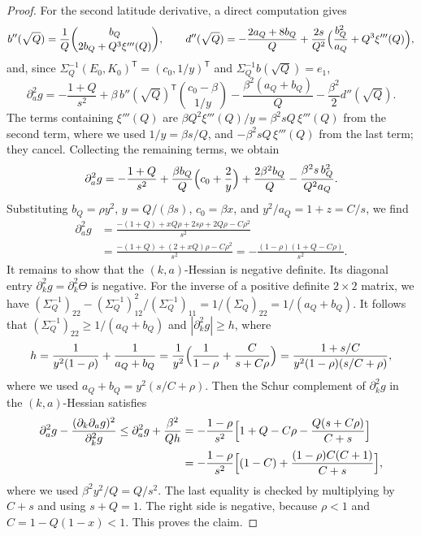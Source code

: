 \begin{proof}
For the second latitude derivative, a direct computation gives
\[
b''(\sqrt Q)=\frac1Q\binom{b_Q}{2b_Q+Q^3\xi'''(Q)},\qquad d''(\sqrt Q)=-\frac{2a_Q+8b_Q}Q+\frac{2s}{Q^2}\Bigl(\frac{b_Q^2}{a_Q}+Q^3\xi'''(Q)\Bigr),
\]
and, since $\Sigma_Q^{-1}(E_0,K_0)^{\mathsf T}=(c_0,1/y)^{\mathsf T}$ and $\Sigma_Q^{-1}b(\sqrt Q)=e_1$,
\[
\partial_a^2g=-\frac{1+Q}{s^2}+\beta\,b''(\sqrt Q)^{\mathsf T}\binom{c_0-\beta}{1/y}-\frac{\beta^2(a_Q+b_Q)}Q-\frac{\beta^2}2d''(\sqrt Q).
\]
The terms containing $\xi'''(Q)$ are $\beta Q^2\xi'''(Q)/y=\beta^2sQ\,\xi'''(Q)$ from the second term, where we used $1/y=\beta s/Q$, and $-\beta^2sQ\,\xi'''(Q)$ from the last term; they cancel. Collecting the remaining terms, we obtain
\[
\partial_a^2g=-\frac{1+Q}{s^2}+\frac{\beta b_Q}Q\Bigl(c_0+\frac2y\Bigr)+\frac{2\beta^2b_Q}Q-\frac{\beta^2s\,b_Q^2}{Q^2a_Q}.
\]
Substituting $b_Q=\rho y^2$, $y=Q/(\beta s)$, $c_0=\beta x$, and $y^2/a_Q=1+z=C/s$, we find
\[
\begin{aligned}
\partial_a^2g&=\frac{-(1+Q)+xQ\rho+2s\rho+2Q\rho-C\rho^2}{s^2}\\
&=\frac{-(1+Q)+(2+xQ)\rho-C\rho^2}{s^2}=-\frac{(1-\rho)(1+Q-C\rho)}{s^2} .
\end{aligned}
\]
It remains to show that the $(k,a)$-Hessian is negative definite. Its diagonal entry $\partial_k^2g=\partial_k^2\Theta$ is negative. For the inverse of a positive definite $2\times2$ matrix, we have $(\Sigma_Q^{-1})_{22}-(\Sigma_Q^{-1})_{12}^2/(\Sigma_Q^{-1})_{11}=1/(\Sigma_Q)_{22}=1/(a_Q+b_Q)$. It follows that $(\Sigma_Q^{-1})_{22}\ge1/(a_Q+b_Q)$ and $|\partial_k^2g|\ge h$, where
\[
h=\frac1{y^2(1-\rho)}+\frac1{a_Q+b_Q}=\frac1{y^2}\Bigl(\frac1{1-\rho}+\frac C{s+C\rho}\Bigr)=\frac{1+s/C}{y^2(1-\rho)(s/C+\rho)},
\]
where we used $a_Q+b_Q=y^2(s/C+\rho)$. Then the Schur complement of $\partial_k^2g$ in the $(k,a)$-Hessian satisfies
\[
\begin{aligned}
\partial_a^2g-\frac{(\partial_k\partial_ag)^2}{\partial_k^2g}\le\partial_a^2g+\frac{\beta^2}{Qh}&=-\frac{1-\rho}{s^2}\Bigl[1+Q-C\rho-\frac{Q(s+C\rho)}{C+s}\Bigr]\\
&=-\frac{1-\rho}{s^2}\Bigl[(1-C)+\frac{(1-\rho)C(C+1)}{C+s}\Bigr],
\end{aligned}
\]
where we used $\beta^2y^2/Q=Q/s^2$. The last equality is checked by multiplying by $C+s$ and using $s+Q=1$. The right side is negative, because $\rho<1$ and $C=1-Q(1-x)<1$. This proves the claim.
\end{proof}


